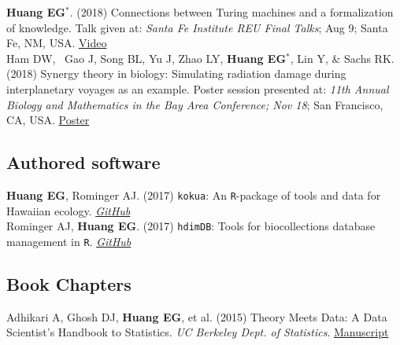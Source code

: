 \documentclass[10pt, letterpaper]{article}
\newcommand{\years}[1]{\marginnote{\scriptsize #1}}
\begin{document}
\noindent
\years{2018}\textbf{Huang EG}$^{*}$. (2018) Connections between Turing machines and a formalization of knowledge. Talk given at: \emph{Santa Fe Institute REU Final Talks}; Aug 9; Santa Fe, NM, USA. \href{https://www.youtube.com/watch?v=10bi_R47uYw&list=PLZlVBTf7N6GpTwEeQOlOmIfYN5J7zciZR&index=6&t=0s}{Video}\\

\years{2018}Ham DW,  Gao J, Song BL, Yu J, Zhao LY, \textbf{Huang EG}$^{*}$, Lin Y, \& Sachs RK. (2018) Synergy theory in biology: Simulating radiation damage during interplanetary voyages as an example. Poster session presented at: \emph{11th Annual Biology and Mathematics in the Bay Area Conference; Nov 18}; San Francisco, CA, USA. \href{https://github.com/sachsURAP/BaMBA_11/blob/master/Bamba17v3.pdf}{Poster}\\

\subsection*{Authored software}
\noindent
\years{2017}\textbf{Huang EG}, Rominger AJ. (2017) \lstinline{kokua}: An \lstinline{R}-package of tools and data for Hawaiian ecology. \emph{\href{https://github.com/hawaiiDimensions/kokua}{GitHub}}\\

\years{2016}Rominger AJ, \textbf{Huang EG}. (2017) \lstinline{hdimDB}: Tools for biocollections database management in \lstinline{R}. \emph{\href{https://github.com/hawaiiDimensions/db/tree/master/hdimDB}{GitHub}}\\

\subsection*{Book Chapters}
\noindent
\years{2015}Adhikari A, Ghosh DJ, \textbf{Huang EG}, et al. (2015) Theory Meets Data: A Data Scientist’s Handbook to Statistics. \emph{UC Berkeley Dept. of Statistics}. {\href{https://github.com/eghuang/stat_94}{Manuscript}}\\

\end{document}
